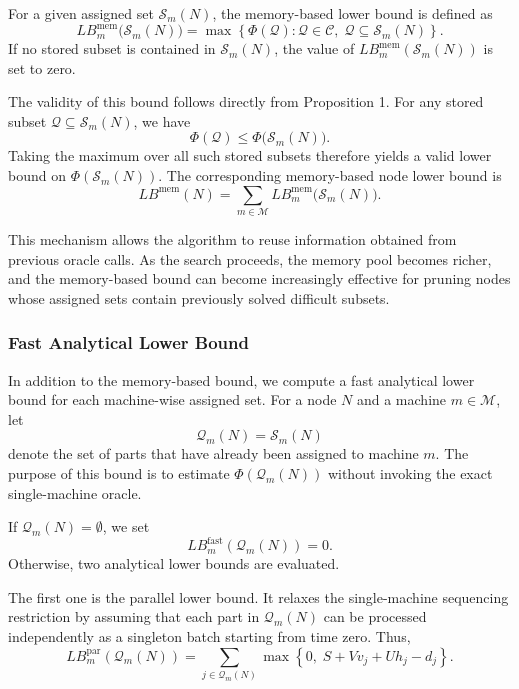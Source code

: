 \documentclass[letterpaper, 10 pt, conference]{ieeeconf}  %
\begin{document}
For a given assigned set $\mathcal{S}_m(N)$, the memory-based lower bound is
defined as
\[
LB_m^{\mathrm{mem}}\bigl(\mathcal{S}_m(N)\bigr)
=
\max
\left\{
\Phi(\mathcal{Q}) :
\mathcal{Q}\in\mathcal{C},
\;
\mathcal{Q}\subseteq \mathcal{S}_m(N)
\right\}.
\]
If no stored subset is contained in $\mathcal{S}_m(N)$, the value of
$LB_m^{\mathrm{mem}}(\mathcal{S}_m(N))$ is set to zero.

The validity of this bound follows directly from Proposition 1. For any
stored subset $\mathcal{Q}\subseteq \mathcal{S}_m(N)$, we have
\[
\Phi(\mathcal{Q})
\le
\Phi\bigl(\mathcal{S}_m(N)\bigr).
\]
Taking the maximum over all such stored subsets therefore yields a valid
lower bound on $\Phi(\mathcal{S}_m(N))$. The corresponding memory-based
node lower bound is
\[
LB^{\mathrm{mem}}(N)
=
\sum_{m\in\mathcal{M}}
LB_m^{\mathrm{mem}}\bigl(\mathcal{S}_m(N)\bigr).
\]

This mechanism allows the algorithm to reuse information obtained from
previous oracle calls. As the search proceeds, the memory pool becomes
richer, and the memory-based bound can become increasingly effective for
pruning nodes whose assigned sets contain previously solved difficult
subsets.
\subsubsection{Fast Analytical Lower Bound}
\label{subsubsec:fast_analytical_lb}

In addition to the memory-based bound, we compute a fast analytical lower
bound for each machine-wise assigned set. For a node $N$ and a machine
$m\in\mathcal{M}$, let
\[
\mathcal{Q}_m(N)=\mathcal{S}_m(N)
\]
denote the set of parts that have already been assigned to machine $m$.
The purpose of this bound is to estimate
$\Phi(\mathcal{Q}_m(N))$ without invoking the exact single-machine oracle.

If $\mathcal{Q}_m(N)=\emptyset$, we set
\[
LB_m^{\mathrm{fast}}(\mathcal{Q}_m(N))=0.
\]
Otherwise, two analytical lower bounds are evaluated.

The first one is the parallel lower bound. It relaxes the single-machine
sequencing restriction by assuming that each part in $\mathcal{Q}_m(N)$ can
be processed independently as a singleton batch starting from time zero.
Thus,
\[
LB_m^{\mathrm{par}}(\mathcal{Q}_m(N))
=
\sum_{j\in\mathcal{Q}_m(N)}
\max
\left\{
0,\;
S+Vv_j+Uh_j-d_j
\right\}.
\]
\end{document}
